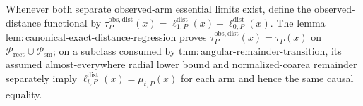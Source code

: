 Whenever both separate observed-arm essential limits exist, define the observed-distance functional by \(\tau_P^{\mathrm{obs,dist}}(x)=\ell^{\mathrm{dist}}_{1,P}(x)-\ell^{\mathrm{dist}}_{0,P}(x)\).  The lemma \(\mathrm{lem:canonical\text{-}exact\text{-}distance\text{-}regression}\) proves \(\tau_P^{\mathrm{obs,dist}}(x)=\tau_P(x)\) on \(\mathcal P_{\mathrm{rect}}\cup\mathcal P_{\mathrm{sm}}\); on a subclass consumed by \(\mathrm{thm:angular\text{-}remainder\text{-}transition}\), its assumed almost-everywhere radial lower bound and normalized-coarea remainder separately imply \(\ell^{\mathrm{dist}}_{t,P}(x)=\mu_{t,P}(x)\) for each arm and hence the same causal equality.